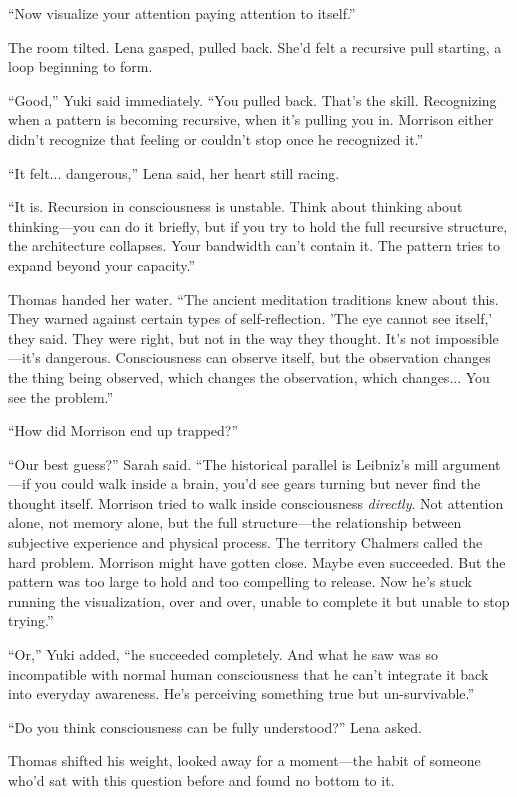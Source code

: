``Now visualize your attention paying attention to itself.''

The room tilted. Lena gasped, pulled back. She'd felt a recursive pull starting, a loop beginning to form.

``Good,'' Yuki said immediately. ``You pulled back. That's the skill. Recognizing when a pattern is becoming recursive, when it's pulling you in. Morrison either didn't recognize that feeling or couldn't stop once he recognized it.''

``It felt... dangerous,'' Lena said, her heart still racing.

``It is. Recursion in consciousness is unstable. Think about thinking about thinking—you can do it briefly, but if you try to hold the full recursive structure, the architecture collapses. Your bandwidth can't contain it. The pattern tries to expand beyond your capacity.''

Thomas handed her water. ``The ancient meditation traditions knew about this. They warned against certain types of self-reflection. 'The eye cannot see itself,' they said. They were right, but not in the way they thought. It's not impossible—it's dangerous. Consciousness can observe itself, but the observation changes the thing being observed, which changes the observation, which changes... You see the problem.''

``How did Morrison end up trapped?''

``Our best guess?'' Sarah said. ``The historical parallel is Leibniz's mill argument—if you could walk inside a brain, you'd see gears turning but never find the thought itself. Morrison tried to walk inside consciousness \textit{directly}. Not attention alone, not memory alone, but the full structure—the relationship between subjective experience and physical process. The territory Chalmers called the hard problem. Morrison might have gotten close. Maybe even succeeded. But the pattern was too large to hold and too compelling to release. Now he's stuck running the visualization, over and over, unable to complete it but unable to stop trying.''

``Or,'' Yuki added, ``he succeeded completely. And what he saw was so incompatible with normal human consciousness that he can't integrate it back into everyday awareness. He's perceiving something true but un-survivable.''

``Do you think consciousness can be fully understood?'' Lena asked.

Thomas shifted his weight, looked away for a moment---the habit of someone who'd sat with this question before and found no bottom to it.

